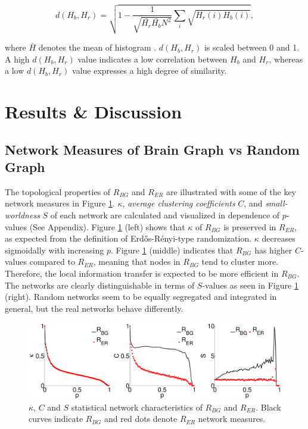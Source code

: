 \documentclass[fleqn,10pt]{wlpeerj}
\begin{document}
\begin{equation}
d(H_b, H_r) = \sqrt{1- \dfrac{1}{ \sqrt{\bar{H_r} \bar{H_b} N^2}} \sum_{i} \sqrt{H_r(i)H_b(i)} } ,
\end{equation}

where $\bar{H}$ denotes the mean of histogram \citep{XYZ43}. $d(H_b, H_r)$ is scaled between 0 and 1. A high $d(H_b, H_r)$ value indicates a low correlation between $H_b$ and $H_r$, whereas a low   $d(H_b, H_r)$ value expresses a high degree of similarity. 



\section*{Results \& Discussion}

\subsection*{Network Measures of Brain Graph vs Random Graph}

The topological properties of $R_{BG}$ and $R_{ER}$ are illustrated with some of the key network measures in Figure \ref{fig:network measures}. $\kappa$, \textit{average clustering coefficients} $C$, and  \textit{small-worldness} $S$ of each network are calculated and visualized in dependence of $p$-values (See Appendix). Figure \ref{fig:network measures} (left) shows that $\kappa$ of $R_{BG}$ is preserved in $R_{ER}$, as expected from the definition of Erd\H{o}s-R\'{e}nyi-type randomization. $\kappa$ decreases sigmoidally with increasing $p$. Figure \ref{fig:network measures} (middle) indicates that $R_{BG}$ has higher $C$-values compared to $R_{ER}$, meaning that nodes in $R_{BG}$ tend to cluster more. Therefore, the local information transfer is expected to be more efficient in $R_{BG}$. The networks are clearly distinguishable in terms of $S$-values as seen in Figure \ref{fig:network measures} (right). Random networks seem to be equally segregated and integrated in general, but the real networks behave differently. 



\begin{figure}[ht]\centering
	\includegraphics[width=\textwidth]{Figures/network_meas.eps}  
\caption{$\kappa$, $C$ and $S$ statistical network characteristics of $R_{BG}$ and $R_{ER}$. Black curves indicate $R_{BG}$ and red dots denote $R_{ER}$ network measures. }
\label{fig:network measures}
\end{figure}
\end{document}
